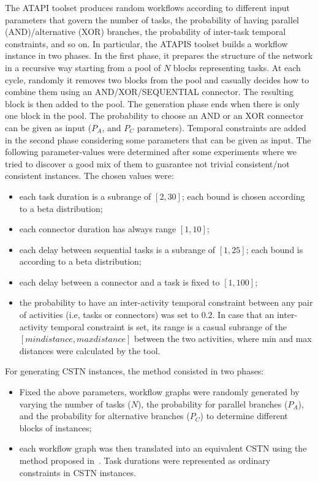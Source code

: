 \documentclass[a4paper,11pt]{article}
\begin{document}
The ATAPI toolset produces random workflows according to different input parameters that govern the number of tasks, the probability of having parallel (AND)\slash alternative (XOR) branches, the probability of inter-task temporal constraints, and so on.
In particular, the ATAPIS toolset builds a workflow instance in two phases. In the first phase, it prepares the structure of the network in a recursive way starting from a pool of $N$ blocks representing tasks.
At each cycle, randomly it removes two blocks from the pool and casually decides how to combine them using an AND/XOR/SEQUENTIAL connector.
The resulting block is then added to the pool. The generation phase ends when there is only one block in the pool. 
The probability to choose an AND or an XOR connector can be given as input ($P_A$, and $P_C$ parameters).
Temporal constraints are added in the second phase considering some parameters that can be given as input. 
The following parameter-values were determined after some experiments where we tried to discover a good mix of them to  guarantee not trivial consistent\slash not consistent instances.
The chosen values were:
\begin{itemize}
\item each task duration is a subrange of $[2, 30]$; each bound is chosen according to a beta distribution;
\item each connector duration has always range $[1, 10]$;
\item each delay between sequential tasks is a subrange of $[1, 25]$; each bound is according to a beta distribution;
\item each delay between a connector and a task is fixed to $[1, 100]$;
\item the probability to have an inter-activity temporal constraint between any pair of activities (i.e, tasks or connectors) was set to $0.2$.
	In case that an inter-activity temporal constraint is set, its range is a casual subrange of the $[min distance, max distance]$ between the two activities, where min and max distances were calculated by the tool.
\end{itemize}

For generating CSTN instances, the method consisted in two phases:
\begin{itemize}
\item Fixed the above parameters, workflow graphs were randomly generated by varying the number of tasks ($N$), the probability for parallel branches ($P_A$), and the probability for alternative branches ($P_C$) to determine different blocks of instances; 
\item each workflow graph was then translated into an equivalent CSTN using the method proposed in~\cite{CombiGMP14}. Task durations were represented as ordinary constraints in CSTN instances.
\end{itemize}
\end{document}
